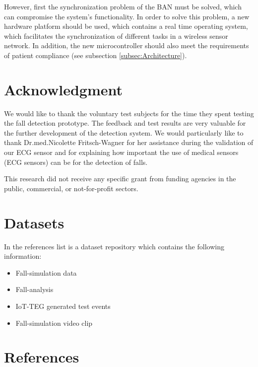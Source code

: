 \documentclass[review]{elsarticle}
\begin{document}
However, first the synchronization problem of the BAN must be solved, which can compromise the system's functionality. In order to solve this problem, a new hardware platform should be used, which contains a real time operating system, which facilitates the synchronization of different tasks in a wireless sensor network. In addition, the new microcontroller should also meet the requirements of patient compliance (see subsection \ref{subsec:Architecture}).



\section*{Acknowledgment}
We would like to thank the voluntary test subjects for the time they spent testing the fall detection prototype. The feedback and test results are very valuable for the further development of the detection system. We would particularly like to thank Dr.med.Nicolette Fritsch-Wagner for her assistance during the validation of our ECG sensor and for explaining how important the use of medical sensors (ECG sensors) can be for the detection of falls. 

This research did not receive any specific grant from funding agencies in the public, commercial, or not-for-profit sectors.


\section*{Datasets}
In the references list \cite{FallRepo} is a dataset repository which contains the following information:
\begin{itemize}
	\item Fall-simulation data
	\item Fall-analysis
	\item IoT-TEG generated test events
	\item Fall-simulation video clip
\end{itemize}

\section*{References}


\end{document}
